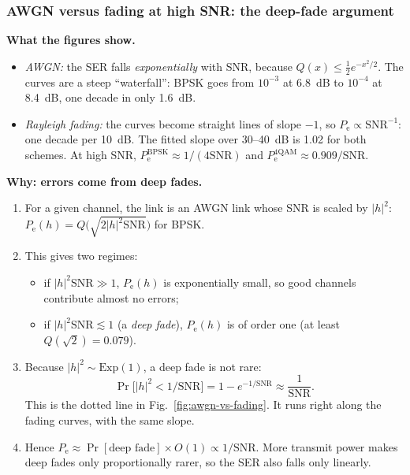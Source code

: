 \documentclass[11pt,a4paper]{article}
\newcommand{\snr}{\mathrm{SNR}}
\newcommand{\abs}[1]{\lvert #1 \rvert}
\newcommand{\Pe}{P_{\mathrm{e}}}
\begin{document}
\subsubsection{AWGN versus fading at high SNR: the deep-fade argument}
\label{sec:p1-deep-fade}

\textbf{What the figures show.}
\begin{itemize}
  \item \emph{AWGN:} the SER falls \emph{exponentially} with SNR, because
        $Q(x) \le \tfrac12 e^{-x^2/2}$. The curves are a steep ``waterfall'': BPSK
        goes from $10^{-3}$ at 6.8~dB to $10^{-4}$ at 8.4~dB, one decade in only
        1.6~dB.
  \item \emph{Rayleigh fading:} the curves become straight lines of slope $-1$, so
        $\Pe \propto \snr^{-1}$: one decade per 10~dB. The fitted slope over
        30--40~dB is 1.02 for both schemes. At high SNR,
        $\Pe^{\mathrm{BPSK}} \approx 1/(4\snr)$ and $\Pe^{\mathrm{4QAM}} \approx 0.909/\snr$.
\end{itemize}

\textbf{Why: errors come from deep fades.}
\begin{enumerate}
  \item For a given channel, the link is an AWGN link whose SNR is scaled by
        $\abs{h}^2$: $\Pe(h) = Q\big(\sqrt{2\abs{h}^2\snr}\big)$ for BPSK.
  \item This gives two regimes:
        \begin{itemize}
          \item if $\abs{h}^2\snr \gg 1$, $\Pe(h)$ is exponentially small, so good
                channels contribute almost no errors;
          \item if $\abs{h}^2\snr \lesssim 1$ (a \emph{deep fade}), $\Pe(h)$ is of order
                one (at least $Q(\sqrt2) = 0.079$).
        \end{itemize}
  \item Because $\abs{h}^2 \sim \mathrm{Exp}(1)$, a deep fade is not rare:
        \begin{equation*}
          \Pr\big[\abs{h}^2 < 1/\snr\big] = 1 - e^{-1/\snr} \approx \frac{1}{\snr}.
        \end{equation*}
        This is the dotted line in Fig.~\ref{fig:awgn-vs-fading}. It runs right along
        the fading curves, with the same slope.
  \item Hence $\Pe \approx \Pr[\text{deep fade}] \times O(1) \propto 1/\snr$. More
        transmit power makes deep fades only proportionally rarer, so the SER also
        falls only linearly.
\end{enumerate}
\end{document}
